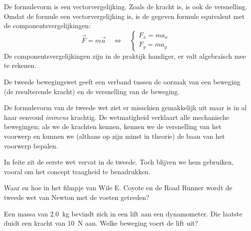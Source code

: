 \documentclass{ximera}
\begin{document}
\begin{remark}{De formulevorm is een vectorvergelijking.} Zoals de kracht is, is ook de versnelling. Omdat de formule een vectorvergelijking is, is de gegeven formule equivalent met de componentsvergelijkingen:
	\begin{equation*}
		\vec{F}=m\vec{a}\quad\Leftrightarrow\quad
		\begin{cases}
			F_x=ma_x \\
			F_y=ma_y
		\end{cases}
	\end{equation*}
	De componentsvergelijkingen zijn in de praktijk handiger, er valt algebra\"isch mee te rekenen.
\end{remark}

De tweede bewegingswet geeft een verband tussen de oorzaak van een beweging (de resulterende kracht) en de versnelling van de beweging.

De formulevorm van de tweede wet ziet er misschien gemakkelijk uit maar is in al haar eenvoud \emph{immens} krachtig. De wetmatigheid verklaart alle mechanische bewegingen; als we de krachten kennen, kennen we de versnelling van het voorwerp en kunnen we (althans op zijn minst in theorie) de baan van het voorwerp bepalen.

In feite zit de eerste wet vervat in de tweede. Toch blijven we hem gebruiken, vooral om het concept traagheid te benadrukken.

\begin{denkvraag*}{}
	Waar en hoe in het filmpje van Wile E. Coyote en de Road Runner wordt de tweede wet van Newton met de voeten getreden?
	\begin{center}
	\end{center}
\end{denkvraag*}

\begin{exercise}
	Een massa van \SI{2,0}{kg} bevindt zich in een lift aan een dynamometer. Die laatste duidt een kracht van \SI{10}{N} aan. Welke beweging voert de lift uit?

	\begin{minipage}[t]{.84\linewidth}
	\begin{multipleChoice}
	\end{multipleChoice}
	\end{minipage}
	\hfill
	\begin{minipage}[t]{.15\linewidth}
		\raisebox{1ex-\height}{%
			\texttt{[image: FV\_9p143]}%
			} 
	\end{minipage}
\end{exercise}
\end{document}
